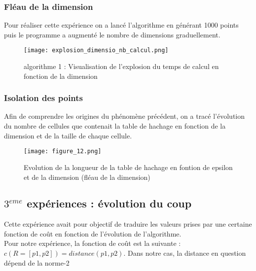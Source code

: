 \documentclass[a4paper,english,titlepage]{article}
\begin{document}
\subsubsection{Fléau de la dimension}
Pour réaliser cette expérience on a lancé l'algorithme en générant 1000 points puis le programme a augmenté le nombre de dimensions graduellement.
	\begin{figure}[h!]	
		\hspace*{0mm}\vfill
		\begin{center}
		\texttt{[image: explosion\_dimensio\_nb\_calcul.png]}
		\caption{algorithme 1 : Visualisation de l'explosion du temps de calcul en fonction de la dimension}
 	 	\end{center}  
		\vfill\hspace*{0mm}
	\end{figure}	
	
	
	\subsubsection{Isolation des points}
Afin de comprendre les origines du phénomène précédent, on a tracé l'évolution du nombre de cellules que contenait la table de hachage en fonction de la dimension et de la taille de chaque cellule.
  	\begin{figure}[h!]	
		\hspace*{0mm}\vfill
		\begin{center}	
		\texttt{[image: figure\_12.png]}
		\caption{Evolution de la longueur de la table de hachage en fontion de epsilon et de la dimension (fléau de la dimension)}
  	 	\end{center}  
		\vfill\hspace*{0mm}	
	\end{figure}

\subsection{$3^{eme}$ expériences : évolution du coup}
Cette expérience avait pour objectif de traduire les valeurs prises par une certaine fonction de coût en fonction de l'évolution de l'algorithme.\\
Pour notre expérience, la fonction de coût est la suivante : $c(R = [p1, p2]) = distance(p1, p2)$. Dans notre cas, la distance en question dépend de la norme-2\\
\end{document}
